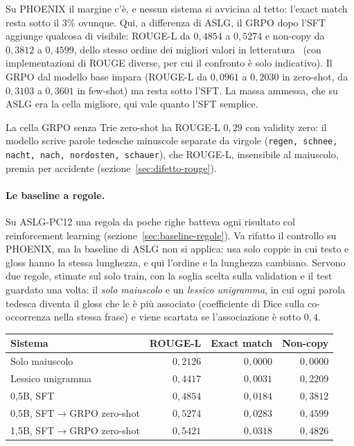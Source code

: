 Su PHOENIX il margine c'è, e nessun sistema si avvicina al tetto: l'exact match
resta sotto il $3\%$ ovunque. Qui, a differenza di ASLG, il GRPO dopo l'SFT
aggiunge qualcosa di visibile: ROUGE-L da $0{,}4854$ a $0{,}5274$ e non-copy da
$0{,}3812$ a $0{,}4599$, dello stesso ordine dei migliori valori in
letteratura~\cite{ouargani2023t2g} (con implementazioni di ROUGE diverse, per
cui il confronto è solo indicativo). Il GRPO dal modello base impara (ROUGE-L
da $0{,}0961$ a $0{,}2030$ in zero-shot, da $0{,}3103$ a $0{,}3601$ in
few-shot) ma resta sotto l'SFT. La massa ammessa, che su ASLG era la cella
migliore, qui vale quanto l'SFT semplice.

La cella GRPO senza Trie zero-shot ha ROUGE-L $0{,}29$ con validity zero: il
modello scrive parole tedesche minuscole separate da virgole
(\texttt{regen, schnee, nacht, nach, nordosten, schauer}), che ROUGE-L,
insensibile al maiuscolo, premia per accidente (sezione~\ref{sec:difetto-rouge}).

\paragraph{Le baseline a regole.} Su ASLG-PC12 una regola da poche righe
batteva ogni risultato col reinforcement learning (sezione~\ref{sec:baseline-regole}).
Va rifatto il controllo su PHOENIX, ma la baseline di ASLG non si applica: usa
solo coppie in cui testo e gloss hanno la stessa lunghezza, e qui l'ordine e la
lunghezza cambiano. Servono due regole, stimate sul solo train, con la soglia
scelta sulla validation e il test guardato una volta: il \emph{solo maiuscolo}
e un \emph{lessico unigramma}, in cui ogni parola tedesca diventa il gloss che
le è più associato (coefficiente di Dice sulla co-occorrenza nella stessa frase)
e viene scartata se l'associazione è sotto $0{,}4$.

\begin{center}
\small
\begin{tabular}{lrrr}
\toprule
Sistema & ROUGE-L & Exact match & Non-copy \\
\midrule
Solo maiuscolo               & $0{,}2126$ & $0{,}0000$ & $0{,}0000$ \\
Lessico unigramma            & $0{,}4417$ & $0{,}0031$ & $0{,}2209$ \\
0,5B, SFT                    & $0{,}4854$ & $0{,}0184$ & $0{,}3812$ \\
0,5B, SFT$\to$GRPO zero-shot & $0{,}5274$ & $0{,}0283$ & $0{,}4599$ \\
1,5B, SFT$\to$GRPO zero-shot & $0{,}5421$ & $0{,}0318$ & $0{,}4826$ \\
\bottomrule
\end{tabular}
\end{center}


